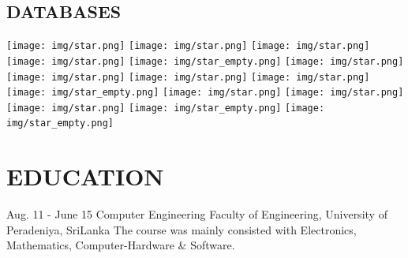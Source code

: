 \documentclass[]{cv-class}
\begin{document}
\begin{aside}
  \section{DATABASES}
    {\texttt{[image: img/star.png]}
    \texttt{[image: img/star.png]}
    \texttt{[image: img/star.png]}
    \texttt{[image: img/star.png]}
    \texttt{[image: img/star\_empty.png]}}
    {\texttt{[image: img/star.png]}
    \texttt{[image: img/star.png]}
    \texttt{[image: img/star.png]}
    \texttt{[image: img/star.png]}
    \texttt{[image: img/star\_empty.png]}}
    {\texttt{[image: img/star.png]}
    \texttt{[image: img/star.png]}
    \texttt{[image: img/star.png]}
    \texttt{[image: img/star\_empty.png]}
    \texttt{[image: img/star\_empty.png]}}    
    ~
\end{aside}

\section{EDUCATION}
\begin{entrylist}
  \entry
    {Aug. 11 - June 15}
    {Computer Engineering}
    {Faculty of Engineering, University of Peradeniya, SriLanka}
    {The course was mainly consisted with Electronics, Mathematics, Computer-Hardware \& Software.}
\end{entrylist}
\end{document}
